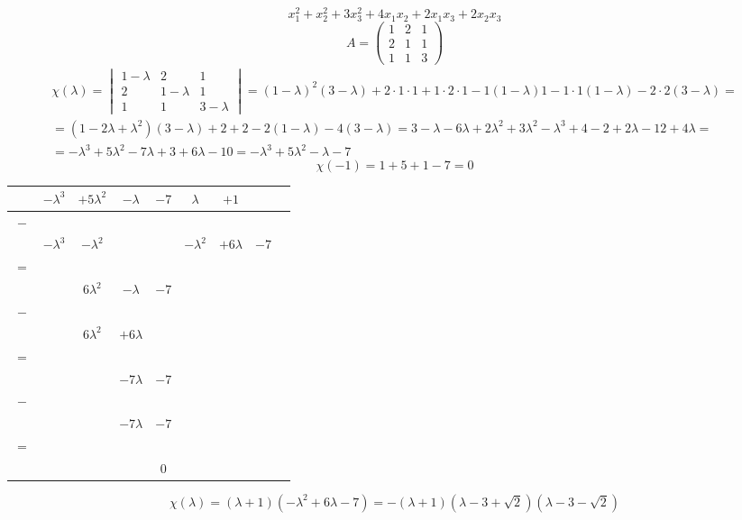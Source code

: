 $$ x_1^2 + x_2^2 + 3x_3^2 + 4x_1x_2 + 2x_1x_3 + 2x_2x_3 $$
$$ A =
\begin{pmatrix}
	1 & 2 & 1 \\
    2 & 1 & 1 \\
    1 & 1 & 3
\end{pmatrix} $$
\begin{multline*}
    \chi(\lambda) =
    \begin{vmatrix}
        1 - \lambda & 2 & 1 \\
        2 & 1 - \lambda & 1 \\
        1 & 1 & 3 - \lambda
    \end{vmatrix} = (1 - \lambda)^2(3 - \lambda) + 2 \cdot 1 \cdot 1 + 1 \cdot 2 \cdot 1 - 1(1 - \lambda)1 - 1 \cdot 1 (1 - \lambda) - 2 \cdot 2 (3 - \lambda) = \\
    = (1 - 2\lambda + \lambda^2)(3 - \lambda) + 2 + 2 - 2(1 - \lambda) - 4(3 - \lambda) = 3 - \lambda - 6\lambda + 2\lambda^2 + 3\lambda^2 - \lambda^3 + 4 - 2 + 2\lambda - 12 + 4\lambda = \\
    = -\lambda^3 + 5\lambda^2 - 7\lambda + 3 + 6\lambda - 10 = -\lambda^3 + 5\lambda^2 - \lambda - 7
\end{multline*}
$$ \chi(-1) = 1 + 5 + 1 - 7 = 0 $$
\begin{tabular}{c c c c c | c c c c}
	& $ -\lambda^3 $ & $ +5\lambda^2 $ & $ -\lambda $ & $ -7 $ & $ \lambda $ & $ +1 $ \\
    \hline
    $ - $ & & & & \\
    & $ -\lambda^3 $ & $ -\lambda^2 $ & $ $ & $ $ & $ -\lambda^2 $ & $ +6\lambda $ & $ -7 $ \\
    $ = $ & & & & \\
    & & $ 6\lambda^2 $ & $ -\lambda $ & $ -7 $ \\
    $ - $ & & & & \\
    & & $ 6\lambda^2 $ & $ +6\lambda $ & \\
    $ = $ & & & & \\
    & & & $ -7\lambda $ & $ -7 $ \\
    $ - $ & & & & \\
    & & & $ -7\lambda $ & $ -7 $ \\
    $ = $ & & & & \\
    & & & & $ 0 $
\end{tabular}
$$ \chi(\lambda) = (\lambda + 1)(-\lambda^2 + 6\lambda - 7) = -(\lambda + 1)(\lambda - 3 + \sqrt2)(\lambda - 3 - \sqrt2) $$
